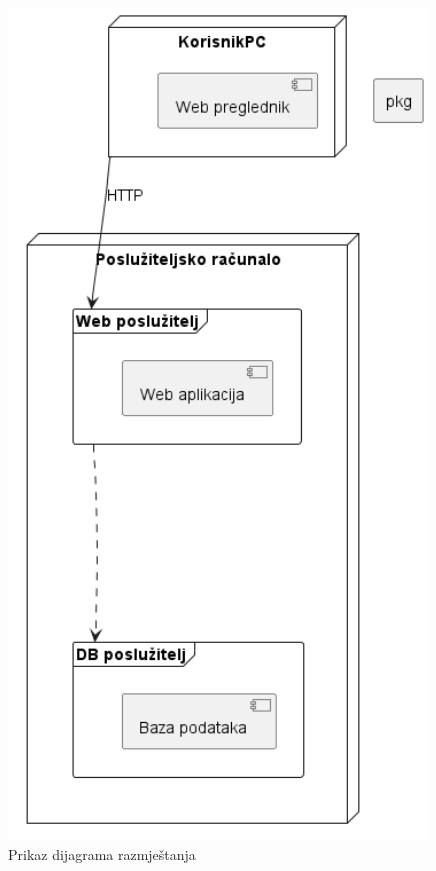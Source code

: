 		\begin{figure} [H]
			\includegraphics[width=1\linewidth]{dijagrami/dijagramRazmjestanja.png}
	        \centering
	        \caption{Prikaz dijagrama razmještanja}
	        \label{fig:Prikaz dijagrama razmještanja}
        \end{figure}


